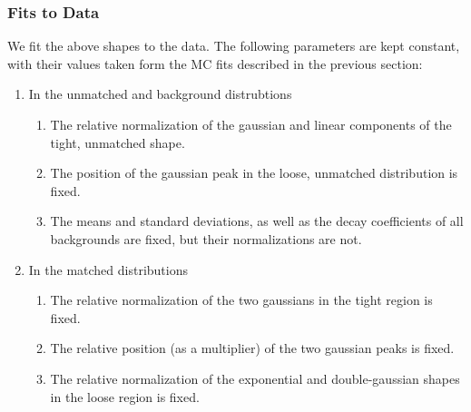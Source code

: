 \subsubsection{Fits to Data}
We fit the above shapes to the data. The following parameters are kept constant, with their values taken form the MC fits described in the previous section:
\begin{enumerate}
\item In the unmatched and background distrubtions
	\begin{enumerate}
	\item The relative normalization of the gaussian and linear components of the tight, unmatched shape.
	\item The position of the gaussian peak in the loose, unmatched distribution is fixed.
	\item The means and standard deviations, as well as the decay coefficients of all backgrounds are fixed, but their normalizations are not.
	\end{enumerate}
\item In the matched distributions
        \begin{enumerate}
	\item The relative normalization of the two gaussians in the tight region is fixed.
	\item The relative position (as a multiplier) of the two gaussian peaks is fixed.
	\item The relative normalization of the exponential and double-gaussian shapes in the loose region is fixed.
        \end{enumerate}
\end{enumerate}

